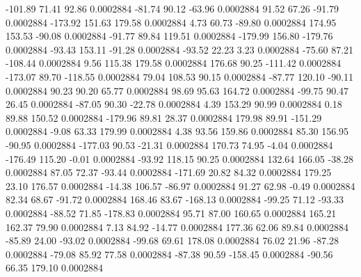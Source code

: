      -101.89       71.41       92.86     0.0002884
      -81.74       90.12      -63.96     0.0002884
       91.52       67.26      -91.79     0.0002884
     -173.92      151.63      179.58     0.0002884
        4.73       60.73      -89.80     0.0002884
      174.95      153.53      -90.08     0.0002884
      -91.77       89.84      119.51     0.0002884
     -179.99      156.80     -179.76     0.0002884
      -93.43      153.11      -91.28     0.0002884
      -93.52       22.23        3.23     0.0002884
      -75.60       87.21     -108.44     0.0002884
        9.56      115.38      179.58     0.0002884
      176.68       90.25     -111.42     0.0002884
     -173.07       89.70     -118.55     0.0002884
       79.04      108.53       90.15     0.0002884
      -87.77      120.10      -90.11     0.0002884
       90.23       90.20       65.77     0.0002884
       98.69       95.63      164.72     0.0002884
      -99.75       90.47       26.45     0.0002884
      -87.05       90.30      -22.78     0.0002884
        4.39      153.29       90.99     0.0002884
        0.18       89.88      150.52     0.0002884
     -179.96       89.81       28.37     0.0002884
      179.98       89.91     -151.29     0.0002884
       -9.08       63.33      179.99     0.0002884
        4.38       93.56      159.86     0.0002884
       85.30      156.95      -90.95     0.0002884
     -177.03       90.53      -21.31     0.0002884
      170.73       74.95       -4.04     0.0002884
     -176.49      115.20       -0.01     0.0002884
      -93.92      118.15       90.25     0.0002884
      132.64      166.05      -38.28     0.0002884
       87.05       72.37      -93.44     0.0002884
     -171.69       20.82       84.32     0.0002884
      179.25       23.10      176.57     0.0002884
      -14.38      106.57      -86.97     0.0002884
       91.27       62.98       -0.49     0.0002884
       82.34       68.67      -91.72     0.0002884
      168.46       83.67     -168.13     0.0002884
      -99.25       71.12      -93.33     0.0002884
      -88.52       71.85     -178.83     0.0002884
       95.71       87.00      160.65     0.0002884
      165.21      162.37       79.90     0.0002884
        7.13       84.92      -14.77     0.0002884
      177.36       62.06       89.84     0.0002884
      -85.89       24.00      -93.02     0.0002884
      -99.68       69.61      178.08     0.0002884
       76.02       21.96      -87.28     0.0002884
      -79.08       85.92       77.58     0.0002884
      -87.38       90.59     -158.45     0.0002884
      -90.56       66.35      179.10     0.0002884
